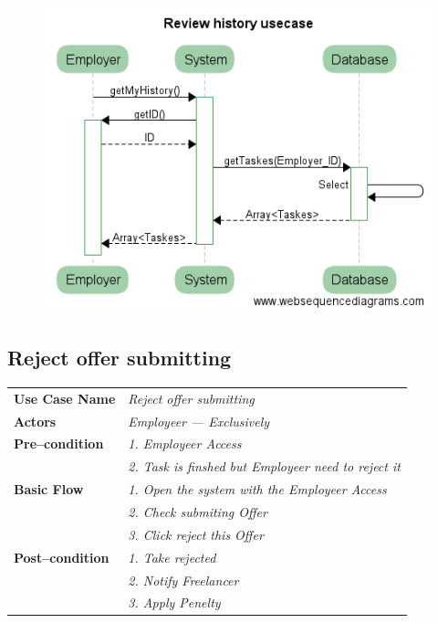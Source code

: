 \documentclass{article}
\begin{document}
\begin{figure}[ht!]
\centering
\includegraphics[width=128mm]{Review_history_usecase.png}
\end{figure}



\subsection{Reject offer submitting }
    \begin{tabular}{ l | l }
    \toprule
      \rowcolor{LightCyan}
      \textbf{Use Case Name}    & \textit{Reject offer submitting}\\
      \textbf{Actors}           & \textit{Employeer --- Exclusively}\\
      \rowcolor{LightCyan}
      \textbf{Pre--condition}   & \textit{1. Employeer Access}\\
	    			& \textit{2. Task is finshed but Employeer need to reject it}\\
      \textbf{Basic Flow}       & \textit{1. Open the system with the Employeer Access}\\
                                & \textit{2. Check submiting Offer}\\
                                & \textit{3. Click reject this Offer}\\
      \rowcolor{LightCyan}
      \textbf{Post--condition}  & \textit{1. Take rejected}\\
	    			& \textit{2. Notify Freelancer}\\
				& \textit{3. Apply Penelty}\\
    \toprule
    \end{tabular}
\end{document}
